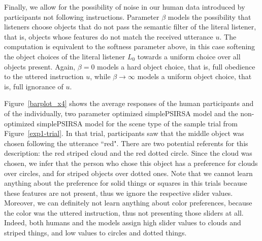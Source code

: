 \documentclass[10pt,a4paper]{article}
\begin{document}

Finally, we allow for the possibility of noise in our human data introduced by participants not following instructions.
Parameter $\beta$ models the possibility that listeners choose objects that do not pass the semantic filter of the literal listener, that is, objects whose features do not match the received utterance $u$. 
The computation is equivalent to the softness parameter above, in this case softening the object choices of the literal listener $L_0$ towards a uniform choice over all objects present. 
Again, $\beta=0$ models a hard object choice, that is, full obedience to the uttered instruction $u$, 
while $\beta \rightarrow \infty$ models a uniform object choice, that is, full ignorance of $u$.

Figure~\ref{barplot_x4} shows the average responses of the human participants and of the individually, two parameter optimized simplePSIRSA model and the non-optimized simplePSIRSA model for the scene type of the sample trial from Figure~\ref{exp1-trial}.
In that trial, participants saw that the middle object was chosen following the utterance ``red". There are two potential referents for this description: the red striped cloud and the red dotted circle. Since the cloud was chosen, we infer that the person who chose this object has a preference for clouds over circles, and for striped objects over dotted ones. 
Note that we cannot learn anything about the preference for solid things or squares in this trials because these features are not present, thus we ignore the respective slider values. 
Moreover, we can definitely not learn anything about color preferences, because the color was the uttered instruction, thus not presenting those sliders at all.  
Indeed, both humans and the models assign high slider values to clouds and striped things, and low values to circles and dotted things. 
\end{document}

